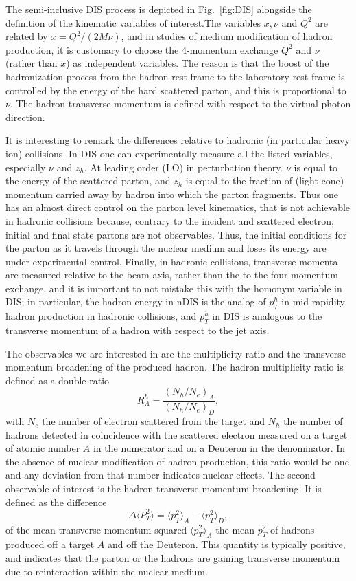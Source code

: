 The semi-inclusive DIS process is depicted in Fig.~\ref{fig:DIS} alongside the definition of the kinematic variables of interest.The variables $x,\nu$ and $Q^2$ are related by  $x = Q^2/(2M\nu)$, and in studies of medium modification of hadron production, it is customary to choose the 4-momentum exchange $Q^2$  and $\nu$ (rather than $x$) as independent variables. The reason is that the boost of the hadronization process from the hadron rest frame to the laboratory rest frame is controlled by the energy of the hard scattered parton, and this is proportional to $\nu$. The hadron transverse momentum is defined with respect to the virtual photon direction.

It is interesting to remark the differences relative to hadronic (in particular heavy ion) collisions. 
In DIS one can experimentally measure all the listed variables, especially $\nu$ and $z_h$. At leading order (LO) in perturbation theory. $\nu$ is equal to the energy of the scattered parton, and $z_h$ is equal to the fraction of (light-cone) momentum carried away by hadron into which the parton fragments. Thus one has an almost direct control on the parton level kinematics, that is not achievable in hadronic collisions because, contrary to the incident and scattered electron, initial and final state partons are not observables.
Thus, the initial conditions for the parton as it travels through the nuclear medium and loses its energy are under experimental control. Finally, in hadronic collisions, transverse momenta are measured relative to the beam axis, rather than the to the four momentum exchange, and it is important to not mistake this with the homonym variable in DIS; in particular, the hadron energy in nDIS is the analog of $p_T^h$ in mid-rapidity hadron production in hadronic collisions, and $p_T^h$ in DIS is analogous to the transverse momentum of a hadron with respect to the jet axis. 

The observables we are interested in are the multiplicity ratio and the 
transverse momentum broadening of the produced hadron. The hadron multiplicity ratio is defined as a double ratio
\begin{equation}
R^h_A = \frac{\left({N_h/N_e}\right)_A }{ \left({N_h/N_{e}}\right)_{D}},
\end{equation}
with $N_e$ the number of electron scattered from the target and $N_h$ the 
number of hadrons detected in coincidence with the scattered electron measured on a target of atomic number $A$ in the numerator and on a Deuteron in the denominator. In the absence of nuclear modification of hadron production, this ratio would be one and any deviation from that number indicates nuclear effects.
%
The second observable of interest is the hadron transverse momentum broadening. It is defined as the difference
\begin{equation}
\Delta \langle P_T^2 \rangle = \langle p_T^2 \rangle_A - \langle p_T^2 \rangle_{D},
\end{equation}
of the mean transverse momentum squared $\langle p_T^2 \rangle_A$ the mean $p_T^2$ of hadrons produced off a target $A$ and off the Deuteron. This quantity is typically positive, and indicates that the parton or the hadrons are gaining transverse momentum due to reinteraction within the nuclear medium.

